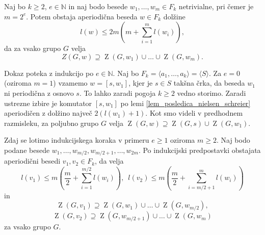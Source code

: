 \begin{lema}
    \label{lem_komutatorska_lema}
     Naj bo $k \ge 2$, $e \in  \mathbb{N}$ in naj bodo besede $w_1, \ldots, w_m \in F_k$ netrivialne, pri čemer je $m = 2^{e}$. Potem obstaja aperiodična beseda $w \in F_k$
     dolžine \begin{equation*}
     l(w) \le 2m \left(m + \sum_{i=1}^{m} l(w_{i}) \right),
     \end{equation*}  
    da za vsako grupo $G$ velja \begin{equation*}
    Z(G, w) \supseteq \operatorname{Z}(G, w_1) \cup \ldots \cup \operatorname{Z}(G, w_m).
    \end{equation*}       
\end{lema}
    \begin{dokaz}
        Dokaz poteka z indukcijo po $e \in  \mathbb{N}$. Naj bo $F_k = \langle a_1, \ldots , a_{k} \rangle = \langle S \rangle$.  Za $e = 0$ (oziroma $m = 1$) vzamemo $w = [s, w_1]$, kjer je $s \in S$ takšna črka, da beseda $w_1$ ni periodična z osnovo $s$. 
        To lahko zaradi pogoja $k \ge 2$ vedno storimo. Zaradi ustrezne izbire je komutator $[s, w_1]$ po lemi \ref{lem_posledica_nielsen_schreier} aperiodičen z dolžino največ $2(l(w_1)  + 1)$.
        Kot smo videli v predhodnem razmisleku, za poljubno grupo $G$ velja $\operatorname{Z}(G, w) \supseteq \operatorname{Z}(G, s) \cup \operatorname{Z}(G, w_1)$.
        
        Zdaj se lotimo indukcijskega koraka v primeru $e \ge 1$ oziroma $m \ge 2$. Naj bodo podane besede $w_1, \ldots, w_{m / 2}, w_{m / 2 + 1}, \ldots, w_{2m}$. Po indukcijski predpostavki obstajata aperiodični besedi $v_1, v_2 \in  F_{k}$,  da velja
        \begin{equation*}
        l(v_1) \le m \left(\frac{m}{2} + \sum_{i=1}^{m / 2} l(w_{i}) \right), \,\,\, l(v_2) \le m \left(\frac{m}{2} + \sum_{i= m / 2 + 1}^{m} l(w_{i}) \right)
        \end{equation*}  
        in \begin{equation*}
        \operatorname{Z}(G, v_1) \supseteq \operatorname{Z}(G, w_1) \cup \ldots \cup \operatorname{Z}(G, w_{m / 2}),
        \end{equation*}  
        \begin{equation*}
            \operatorname{Z}(G, v_2) \supseteq \operatorname{Z}(G, w_{m / 2 + 1}) \cup \ldots \cup \operatorname{Z}(G, w_{m})
        \end{equation*}  
        za vsako grupo $G$.


\end{dokaz}
